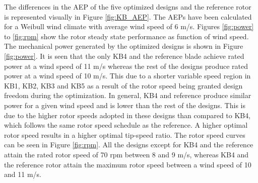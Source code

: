 \begin{table}[pht]
\centering
\caption{Summary of overall properties of the five optimized blades.}
\label{tab:overall_summary}
\end{table}
The differences in the AEP of the five optimized designs and the reference rotor is represented visually in Figure \ref{fig:KB_AEP}. The AEPs have been calculated for a Weibull wind climate with average wind speed of 6 m/s.
Figures \ref{fig:power} to \ref{fig:rpm} show the rotor steady state performance as function of wind speed. The mechanical power generated by the optimized designs is shown in Figure \ref{fig:power}. It is seen that the only KB4 and the reference blade achieve rated power at a wind speed of 11 m/s whereas the rest of the designs produce rated power at a wind speed of 10 m/s. This due to a shorter variable speed region in KB1, KB2, KB3 and KB5 as a result of the rotor speed being granted design freedom during the optimization. In general, KB4 and reference produce similar power for a given wind speed and is lower than the rest of the designs. This is due to the higher rotor speeds adopted in these designs than compared to KB4, which follows the same rotor speed schedule as the reference. A higher optimal rotor speed results in a higher optimal tip-speed ratio. The rotor speed curves can be seen in Figure \ref{fig:rpm}. All the designs except for KB4 and the reference attain the rated rotor speed of 70 rpm between 8 and 9 m/s, whereas KB4 and the reference rotor attain the maximum rotor speed between a wind speed of 10 and 11 m/s. 

